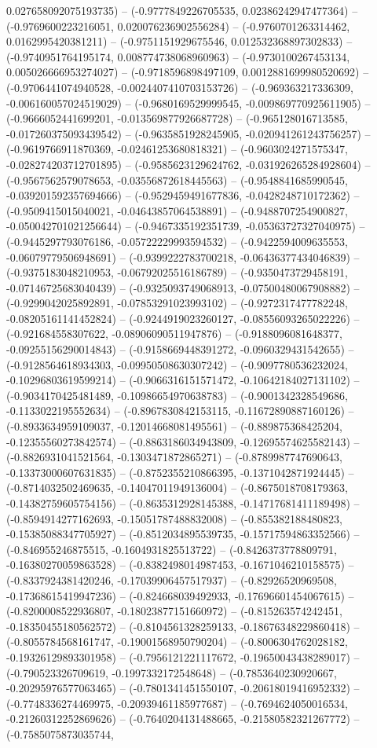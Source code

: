 0.027658092075193735) -- (-0.9777849226705535, 0.02386242947477364) -- (-0.9769600223216051, 0.020076236902556284) -- (-0.9760701263314462, 0.0162995420381211) -- (-0.9751151929675546, 0.012532368897302833) -- (-0.9740951764195174, 0.008774738068960963) -- (-0.9730100267453134, 0.005026666953274027) -- (-0.9718596898497109, 0.0012881699980520692) -- (-0.9706441074940528, -0.0024407410703153726) -- (-0.969363217336309, -0.006160057024519029) -- (-0.9680169529999545, -0.009869770925611905) -- (-0.9666052441699201, -0.013569877926687728) -- (-0.965128016713585, -0.017260375093439542) -- (-0.9635851928245905, -0.020941261243756257) -- (-0.9619766911870369, -0.02461253680818321) -- (-0.9603024271575347, -0.028274203712701895) -- (-0.9585623129624762, -0.031926265284928604) -- (-0.9567562579078653, -0.03556872618445563) -- (-0.9548841685990545, -0.039201592357694666) -- (-0.9529459491677836, -0.0428248710172362) -- (-0.9509415015040021, -0.04643857064538891) -- (-0.9488707254900827, -0.050042701021256644) -- (-0.9467335192351739, -0.05363727327040975) -- (-0.9445297793076186, -0.05722229993594532) -- (-0.9422594009635553, -0.06079779506948691) -- (-0.9399222783700218, -0.06436377434046839) -- (-0.9375183048210953, -0.06792025516186789) -- (-0.9350473729458191, -0.07146725683040439) -- (-0.9325093749068913, -0.07500480067908882) -- (-0.9299042025892891, -0.07853291023993102) -- (-0.9272317477782248, -0.08205161141452824) -- (-0.9244919023260127, -0.08556093265022226) -- (-0.921684558307622, -0.08906090511947876) -- (-0.9188096081648377, -0.09255156290014843) -- (-0.9158669448391272, -0.0960329431542655) -- (-0.9128564618934303, -0.09950508630307242) -- (-0.9097780536232024, -0.10296803619599214) -- (-0.9066316151571472, -0.10642184027131102) -- (-0.9034170425481489, -0.10986654970638783) -- (-0.9001342328549686, -0.1133022195552634) -- (-0.8967830842153115, -0.11672890887160126) -- (-0.8933634959109037, -0.12014668081495561) -- (-0.889875368425204, -0.12355560273842574) -- (-0.8863186034943809, -0.12695574625582143) -- (-0.8826931041521564, -0.1303471872865271) -- (-0.8789987747690643, -0.13373000607631835) -- (-0.8752355210866395, -0.1371042871924445) -- (-0.8714032502469635, -0.14047011949136004) -- (-0.8675018708179363, -0.14382759605754156) -- (-0.8635312928145388, -0.14717681411189498) -- (-0.8594914277162693, -0.15051787488832008) -- (-0.855382188480823, -0.15385088347705927) -- (-0.8512034895539735, -0.15717594863352566) -- (-0.846955246875515, -0.1604931825513722) -- (-0.8426373778809791, -0.16380270059863528) -- (-0.8382498014987453, -0.1671046210158575) -- (-0.8337924381420246, -0.17039906457517937) -- (-0.82926520969508, -0.17368615419947236) -- (-0.824668039492933, -0.17696601454067615) -- (-0.8200008522936807, -0.18023877151660972) -- (-0.815263574242451, -0.18350455180562572) -- (-0.8104561328259133, -0.18676348229860418) -- (-0.8055784568161747, -0.19001568950790204) -- (-0.8006304762028182, -0.19326129893301958) -- (-0.7956121221117672, -0.19650043438289017) -- (-0.790523326709619, -0.1997332172548648) -- (-0.7853640230920667, -0.20295976577063465) -- (-0.7801341451550107, -0.20618019416952332) -- (-0.7748336274469975, -0.20939461185977687) -- (-0.7694624050016534, -0.21260312252869626) -- (-0.7640204131488665, -0.21580582321267772) -- (-0.7585075873035744, 
